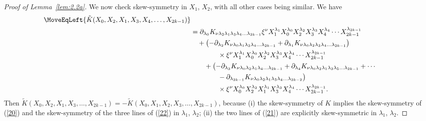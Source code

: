 \documentclass[pdftex]{sigma}
\numberwithin{equation}{section}
\theoremstyle{definition}
\begin{document}
\begin{proof}[Proof of Lemma~\ref{lem:2.2a}]
We now check skew-symmetry in $X_1$, $X_2$, with all other cases being similar. We have
\begin{align}
\MoveEqLeft{\tilde K(X_0,X_2, X_1, X_3, X_4, \dots,X_{2k-1}) }\nonumber\\
&= \partial_{\lambda_0} K_{\nu \lambda_2\lambda_1\lambda_3\lambda_4\dots\lambda_{2k-1}}
\xi^\nu X_1^{\lambda_1} X_0^{\lambda_0} X_2^{\lambda_2}X_3^{\lambda_3}X_4^{\lambda_4} \cdots X_{2k-1}^{\lambda_{2k-1}}\label{20}\\
&\quad +\bigl( - \partial_{\lambda_2} K_{\nu \lambda_0\lambda_1\lambda_3\lambda_4\dots\lambda_{2k-1}}
+ \partial_{\lambda_1} K_{\nu \lambda_0\lambda_2\lambda_3\lambda_4\dots\lambda_{2k-1}} \bigr)\nonumber\\
&\qquad \qquad \times
\xi^\nu X_1^{\lambda_1} X_0^{\lambda_0} X_2^{\lambda_2}X_3^{\lambda_3}X_4^{\lambda_4} \cdots X_{2k-1}^{\lambda_{2k-1}}\label{21}\\
&\qquad +\bigl(- \partial_{\lambda_3} K_{\nu \lambda_0\lambda_2\lambda_1\lambda_4\dots\lambda_{2k-1}}
+ \partial_{\lambda_4} K_{\nu \lambda_0\lambda_2\lambda_1\lambda_3\lambda_5\dots\lambda_{2k-1}}
+\cdots\nonumber\\
&\qquad\qquad - \partial_{\lambda_{2k-1}} K_{\nu \lambda_0\lambda_2\lambda_1\lambda_3\lambda_4
\dots \lambda_{2k-2}}\bigr)\nonumber\\
&\qquad \qquad \times\xi^\nu X_0^{\lambda_0} X_2^{\lambda_2}X_1^{\lambda_1}X_3^{\lambda_3}X_4^{\lambda_4}\cdots X_{2k-1}^{\lambda_{2k-1}}.\label{22}
\end{align}
Then $\tilde K(X_0,X_2, X_1, X_3, \dots, X_{2k-1}) = - \tilde K(X_0,X_1, X_2, X_3, \dots, X_{2k-1}) $, because
(i) the skew-symmetry of $K$ implies the skew-symmetry of (\ref{20}) and the skew-symmetry of the three lines of (\ref{22}) in $\lambda_1$, $\lambda_2$; (ii) the two lines of
(\ref{21}) are explicitly skew-symmetric in $\lambda_1$, $\lambda_2$.
\end{proof}
\end{document}
